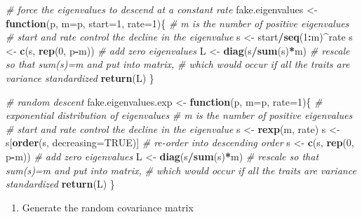 \documentclass[]{book}
\newenvironment{Shaded}{\begin{snugshade}}{\end{snugshade}}
\newcommand{\KeywordTok}[1]{\textcolor[rgb]{0.13,0.29,0.53}{\textbf{#1}}}
\newcommand{\DataTypeTok}[1]{\textcolor[rgb]{0.13,0.29,0.53}{#1}}
\newcommand{\DecValTok}[1]{\textcolor[rgb]{0.00,0.00,0.81}{#1}}
\newcommand{\StringTok}[1]{\textcolor[rgb]{0.31,0.60,0.02}{#1}}
\newcommand{\CommentTok}[1]{\textcolor[rgb]{0.56,0.35,0.01}{\textit{#1}}}
\newcommand{\OtherTok}[1]{\textcolor[rgb]{0.56,0.35,0.01}{#1}}
\newcommand{\ControlFlowTok}[1]{\textcolor[rgb]{0.13,0.29,0.53}{\textbf{#1}}}
\newcommand{\OperatorTok}[1]{\textcolor[rgb]{0.81,0.36,0.00}{\textbf{#1}}}
\newcommand{\NormalTok}[1]{#1}
\providecommand{\tightlist}{%
  \setlength{\itemsep}{0pt}\setlength{\parskip}{0pt}}
\begin{document}
\begin{Shaded}
\begin{Highlighting}[]
\CommentTok{# force the eigenvalues to descend at a constant rate}
\NormalTok{fake.eigenvalues <-}\StringTok{ }\ControlFlowTok{function}\NormalTok{(p, }\DataTypeTok{m=}\NormalTok{p, }\DataTypeTok{start=}\DecValTok{1}\NormalTok{, }\DataTypeTok{rate=}\DecValTok{1}\NormalTok{)\{}
  \CommentTok{# m is the number of positive eigenvalues}
  \CommentTok{# start and rate control the decline in the eigenvalue}
\NormalTok{  s <-}\StringTok{ }\NormalTok{start}\OperatorTok{/}\KeywordTok{seq}\NormalTok{(}\DecValTok{1}\OperatorTok{:}\NormalTok{m)}\OperatorTok{^}\NormalTok{rate}
\NormalTok{  s <-}\StringTok{ }\KeywordTok{c}\NormalTok{(s, }\KeywordTok{rep}\NormalTok{(}\DecValTok{0}\NormalTok{, p}\OperatorTok{-}\NormalTok{m)) }\CommentTok{# add zero eigenvalues}
\NormalTok{  L <-}\StringTok{ }\KeywordTok{diag}\NormalTok{(s}\OperatorTok{/}\KeywordTok{sum}\NormalTok{(s)}\OperatorTok{*}\NormalTok{m) }\CommentTok{# rescale so that sum(s)=m and put into matrix,}
  \CommentTok{# which would occur if all the traits are variance standardized}
  \KeywordTok{return}\NormalTok{(L)}
\NormalTok{\}}

\CommentTok{# random descent}
\NormalTok{fake.eigenvalues.exp <-}\StringTok{ }\ControlFlowTok{function}\NormalTok{(p, }\DataTypeTok{m=}\NormalTok{p, }\DataTypeTok{rate=}\DecValTok{1}\NormalTok{)\{}
  \CommentTok{# exponential distribution of eigenvalues}
  \CommentTok{# m is the number of positive eigenvalues}
  \CommentTok{# start and rate control the decline in the eigenvalue}
\NormalTok{  s <-}\StringTok{ }\KeywordTok{rexp}\NormalTok{(m, rate)}
\NormalTok{  s <-}\StringTok{ }\NormalTok{s[}\KeywordTok{order}\NormalTok{(s, }\DataTypeTok{decreasing=}\OtherTok{TRUE}\NormalTok{)] }\CommentTok{# re-order into descending order}
\NormalTok{  s <-}\StringTok{ }\KeywordTok{c}\NormalTok{(s, }\KeywordTok{rep}\NormalTok{(}\DecValTok{0}\NormalTok{, p}\OperatorTok{-}\NormalTok{m)) }\CommentTok{# add zero eigenvalues}
\NormalTok{  L <-}\StringTok{ }\KeywordTok{diag}\NormalTok{(s}\OperatorTok{/}\KeywordTok{sum}\NormalTok{(s)}\OperatorTok{*}\NormalTok{m) }\CommentTok{# rescale so that sum(s)=m and put into matrix,}
  \CommentTok{# which would occur if all the traits are variance standardized}
  \KeywordTok{return}\NormalTok{(L)}
\NormalTok{\}}
\end{Highlighting}
\end{Shaded}

\begin{enumerate}
\def\labelenumi{\arabic{enumi}.}
\setcounter{enumi}{2}
\tightlist
\item
  Generate the random covariance matrix
\end{enumerate}
\end{document}
